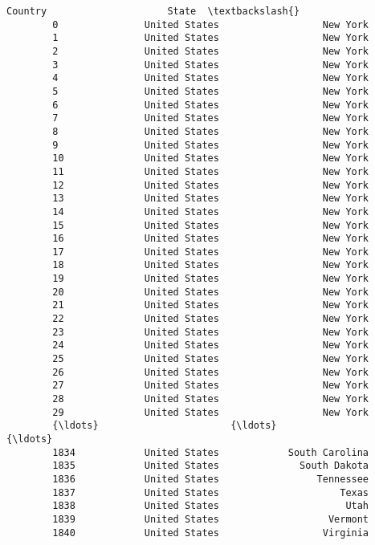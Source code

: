 \documentclass[11pt]{article}
\begin{document}
\begin{Verbatim}[commandchars=\\\{\}]
                              Country                     State  \textbackslash{}
        0               United States                  New York   
        1               United States                  New York   
        2               United States                  New York   
        3               United States                  New York   
        4               United States                  New York   
        5               United States                  New York   
        6               United States                  New York   
        7               United States                  New York   
        8               United States                  New York   
        9               United States                  New York   
        10              United States                  New York   
        11              United States                  New York   
        12              United States                  New York   
        13              United States                  New York   
        14              United States                  New York   
        15              United States                  New York   
        16              United States                  New York   
        17              United States                  New York   
        18              United States                  New York   
        19              United States                  New York   
        20              United States                  New York   
        21              United States                  New York   
        22              United States                  New York   
        23              United States                  New York   
        24              United States                  New York   
        25              United States                  New York   
        26              United States                  New York   
        27              United States                  New York   
        28              United States                  New York   
        29              United States                  New York   
        {\ldots}                       {\ldots}                       {\ldots}   
        1834            United States            South Carolina   
        1835            United States              South Dakota   
        1836            United States                 Tennessee   
        1837            United States                     Texas   
        1838            United States                      Utah   
        1839            United States                   Vermont   
        1840            United States                  Virginia   

\end{Verbatim}
\end{document}
